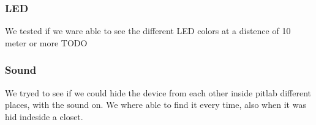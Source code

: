 \subsubsection{LED}
We tested if we ware able to see the different LED colors at a distence of 10 meter or more
TODO 

\subsubsection{Sound}
We tryed to see if we could hide the device from each other inside pitlab different places, with the sound on.
We where able to find it every time, also when it was hid indeside a closet.
